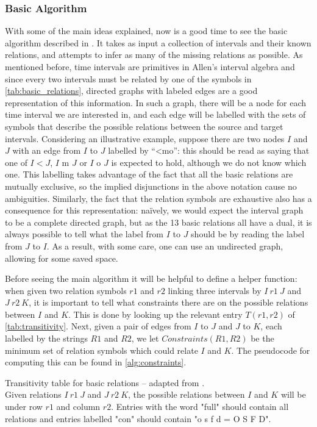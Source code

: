 \subsubsection{Basic Algorithm}%
\label{ssub:basic_algorithm}

With some of the main ideas explained, now is a good time to see the basic algorithm described in
\cite{allen83}. It takes as input a collection of intervals and their known relations, and
attempts to infer as many of the missing relations as possible. As mentioned
before, time intervals are primitives in Allen's interval algebra and since every two intervals
must be related by one of the symbols in \cref{tab:basic_relations}, directed graphs with
labeled edges are a good representation of this information. In such a graph, there will be a node
for each time interval we are interested in, and each edge will be labelled with the sets of
symbols that describe the possible relations between the source and target intervals. Considering
an illustrative example, suppose there are two nodes $I$ and $J$ with an edge from $I$ to $J$
labelled by ``<mo'': this should be read as saying that one of $I < J$, $I\text{ m }J$ or
$I\text{ o }J$ is expected to hold, although we do not know which one.
This labelling takes advantage of the fact that all the basic relations
are mutually exclusive, so the implied disjunctions in the above notation cause no ambiguities.
Similarly, the fact that the relation symbols are exhaustive also has a consequence for this
representation: naïvely, we would expect the interval graph to be a complete directed graph,
but as the 13 basic relations all have a dual, it is always possible to tell what the label from
$I$ to $J$ should be by reading the label from $J$ to $I$. As a result, with some care, one can use
an undirected graph, allowing for some saved space.

Before seeing the main algorithm
it will be helpful to define a helper function: when given two relation
symbols $r1$ and $r2$ linking three intervals by $I\ r1\ J$ and $J\ r2\ K$, it is important to tell
what constraints there are on the possible relations between $I$ and $K$. 
This is done by looking up the relevant entry $T(r1,r2)$ of
\cref{tab:transitivity}. Next, given a pair of edges from $I$ to $J$ and $J$ to $K$, each
labelled by the strings $R1$ and $R2$, we let $\textit{Constraints}(R1,R2)$ be the minimum set of
relation symbols which could relate $I$ and $K$. The pseudocode for computing this can be found in
\cref{alg:constraints}.

\begin{table}[htpb]
  \centering
  
  \caption{Transitivity table for basic relations -- adapted from \cite{thomaswebsite}.\\
  Given relations $I\ r1\ J$ and $J\ r2\ K$,
  the possible relations between $I$ and $K$ will be under row $r1$ and column $r2$. Entries
  with the word "full" should contain all relations and entries labelled "con" should contain
  "o s f d = O S F D".}
  \label{tab:transitivity}
\end{table}


